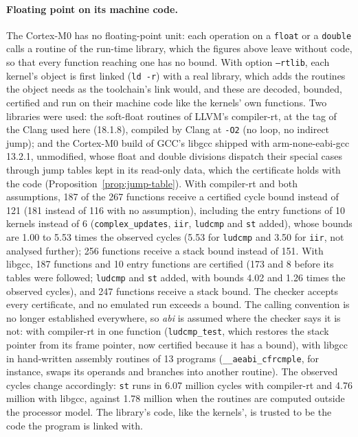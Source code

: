 \documentclass[oneside,english]{amsart}
\numberwithin{equation}{section}
\theoremstyle{plain}
\theoremstyle{definition}
\theoremstyle{plain}
\theoremstyle{plain}
\theoremstyle{remark}
\begin{document}
\paragraph{Floating point on its machine code.} The Cortex-M0 has no floating-point unit: each operation on a \texttt{float} or a \texttt{double} calls a routine of the run-time library, which the figures above leave without code, so that every function reaching one has no bound. With option \texttt{--rtlib}, each kernel's object is first linked (\texttt{ld -r}) with a real library, which adds the routines the object needs as the toolchain's link would, and these are decoded, bounded, certified and run on their machine code like the kernels' own functions. Two libraries were used: the soft-float routines of LLVM's compiler-rt, at the tag of the Clang used here (18.1.8), compiled by Clang at \texttt{-O2} (no loop, no indirect jump); and the Cortex-M0 build of GCC's libgcc shipped with arm-none-eabi-gcc 13.2.1, unmodified, whose float and double divisions dispatch their special cases through jump tables kept in its read-only data, which the certificate holds with the code (Proposition~\ref{prop:jump-table}). With compiler-rt and both assumptions, 187 of the 267 functions receive a certified cycle bound instead of 121 (181 instead of 116 with no assumption), including the entry functions of 10 kernels instead of 6 (\texttt{complex\_updates}, \texttt{iir}, \texttt{ludcmp} and \texttt{st} added), whose bounds are 1.00 to 5.53 times the observed cycles (5.53 for \texttt{ludcmp} and 3.50 for \texttt{iir}, not analysed further); 256 functions receive a stack bound instead of 151. With libgcc, 187 functions and 10 entry functions are certified (173 and 8 before its tables were followed; \texttt{ludcmp} and \texttt{st} added, with bounds 4.02 and 1.26 times the observed cycles), and 247 functions receive a stack bound. The checker accepts every certificate, and no emulated run exceeds a bound. The calling convention is no longer established everywhere, so \emph{abi} is assumed where the checker says it is not: with compiler-rt in one function (\texttt{ludcmp\_test}, which restores the stack pointer from its frame pointer, now certified because it has a bound), with libgcc in hand-written assembly routines of 13 programs (\texttt{\_\_aeabi\_cfrcmple}, for instance, swaps its operands and branches into another routine). The observed cycles change accordingly: \texttt{st} runs in 6.07 million cycles with compiler-rt and 4.76 million with libgcc, against 1.78 million when the routines are computed outside the processor model. The library's code, like the kernels', is trusted to be the code the program is linked with.
\end{document}
